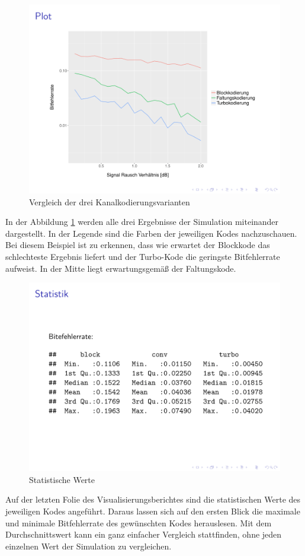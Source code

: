 \begin{figure}[!ht]
\centering
\includegraphics[width=\ScaleIfNeeded]{pictures/ChannelcodingSimulation1}
\caption{Vergleich der drei Kanalkodierungsvarianten}
\label{pic:ChannelcodingSimulation}
\end{figure}

In der Abbildung \ref{pic:ChannelcodingSimulation} werden alle drei Ergebnisse der Simulation miteinander dargestellt. In der Legende sind die Farben der jeweiligen Kodes nachzuschauen. Bei diesem Beispiel ist zu erkennen, dass wie erwartet der Blockkode das schlechteste Ergebnis liefert und der Turbo-Kode die geringste Bitfehlerrate aufweist. In der Mitte liegt erwartungsgemäß der Faltungskode.

\begin{figure}[!ht]
\centering
\includegraphics[width=\ScaleIfNeeded]{pictures/ChannelcodingSimulation2}
\caption{Statistische Werte}
\label{pic:ChannelcodingSimulationStatistic}
\end{figure}

Auf der letzten Folie des Visualisierungsberichtes sind die statistischen Werte des jeweiligen Kodes angeführt. Daraus lassen sich auf den ersten Blick die maximale und minimale Bitfehlerrate des gewünschten Kodes herauslesen. Mit dem Durchschnittswert kann ein ganz einfacher Vergleich stattfinden, ohne jeden einzelnen Wert der Simulation zu vergleichen.